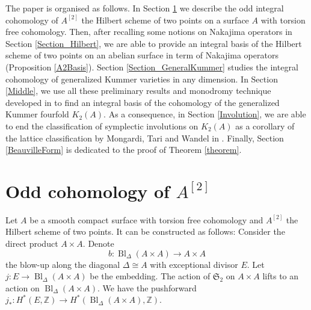 \documentclass{alggeom}
\DeclareMathOperator{\Bl}{Bl}
\newcommand{\hilb}[1]{^{[#1]}}
\newcommand{\Z}{\mathbb{Z}}
\theoremstyle{plain}
\theoremstyle{definition}
\theoremstyle{remark}
\begin{document}

The paper is organised as follows. In Section \ref{OddHilb2} we describe the odd integral cohomology of $A^{[2]}$ the Hilbert scheme of two points on a surface $A$ with torsion free cohomology. 
Then, after recalling some notions on Nakajima operators in Section \ref{Section_Hilbert}, 
we are able to provide an integral basis of the Hilbert scheme of two points on an abelian surface in term of Nakajima operators (Proposition \ref{A2Basis}).
Section \ref{Section_GeneralKummer} studies the integral cohomology of generalized Kummer varieties in any dimension.
In Section \ref{Middle}, we use all these preliminary results and monodromy technique developed in \cite{Hassett} to find an integral basis of the cohomology of the generalized Kummer fourfold $K_2(A)$.
As a consequence, in Section \ref{Involution}, we are able 
to end the classification of symplectic involutions on $K_2(A)$ as a corollary of the lattice classification by Mongardi, Tari and Wandel in \cite{MongWanTari}.
Finally, Section \ref{BeauvilleForm} is dedicated to the proof of Theorem \ref{theorem}.
~\\



%
%

\section{Odd cohomology of \texorpdfstring{$A\hilb{2}$}{the Hilbert scheme of two points}}\label{OddHilb2}
Let $A$ be a smooth compact surface with torsion free cohomology and $A\hilb{2}$ the Hilbert scheme of two points. 
It can be constructed as follows: Consider the direct product $A\times A$. Denote 
$$b: \Bl_\Delta(A\! \times\! A) \rightarrow A\times A $$ 
the blow-up along the diagonal $\Delta \cong A$ with exceptional divisor $E$.
Let $j: E\rightarrow \Bl_\Delta(A\! \times\! A) $ be the embedding. 
The action of $\mathfrak{S}_2$ on $A\times A$ lifts to an action on $\Bl_\Delta(A\! \times\! A)$. 
We have the pushforward $j_*:H^*(E,\Z)\rightarrow H^*(\Bl_\Delta(A\! \times\! A),\Z) $.
\end{document}
